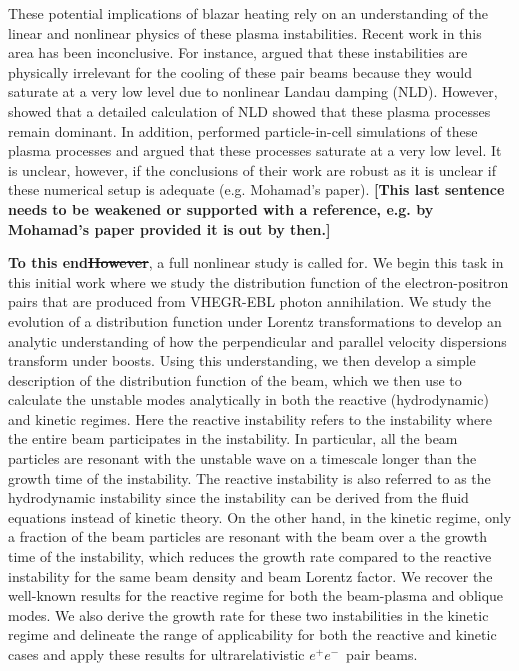 \documentclass[usenatbib,iop,apj,numberedappendix]{aeb_emulateapj_2015}
\newcommand\cp[1]{{\color{blue} \bf #1}} %
\newcommand{\epm}{\ensuremath{e^+e^-}}
\begin{document}
These potential implications of blazar heating rely on an understanding of the linear and nonlinear physics of these plasma instabilities.  Recent work in this area has been inconclusive.  For instance, \citet{Miniati+12} argued that these instabilities are physically irrelevant for the cooling of these pair beams because they would saturate at a very low level due to nonlinear Landau damping (NLD).  However, \citet{Chang+14} showed that a detailed calculation of NLD showed that these plasma processes remain dominant.  In addition, \citet{Sironi+14} performed particle-in-cell simulations of these plasma processes and argued that these processes saturate at a very low level.  It is unclear, however, if the conclusions of their work are robust as it is unclear if these numerical setup is adequate (e.g. Mohamad's paper).  \cp{[This last sentence needs to be weakened or supported with a reference, e.g. by Mohamad's paper provided it is out by then.]}

\cp{To this end\sout{However}}, a full nonlinear study is called for.  We begin this task in this initial work where we study the distribution function of the electron-positron pairs that are produced from VHEGR-EBL photon annihilation.  We study the evolution of a distribution function under Lorentz transformations to develop an analytic understanding of how the perpendicular and parallel velocity dispersions transform under boosts.  Using this understanding, we then develop a simple description of the distribution function of the beam, which we then use to calculate the unstable modes analytically in both the reactive (hydrodynamic) and kinetic regimes. Here the reactive instability refers to the instability where the entire beam participates in the instability.  In particular, all the beam particles are resonant with the unstable wave on a timescale longer than the growth time of the instability.  The reactive instability is also referred to as the hydrodynamic instability since the instability can be derived from the fluid equations instead of kinetic theory.  On the other hand, in the kinetic regime, only a fraction of the beam particles are resonant with the beam over a the growth time of the instability, which reduces the growth rate compared to the reactive instability for the same beam density and beam Lorentz factor.  We recover the well-known results for the reactive regime for both the beam-plasma and oblique modes.  We also derive the growth rate for these two instabilities in the kinetic regime and delineate the range of applicability for both the reactive and kinetic cases and apply these results for ultrarelativistic \epm\ pair beams. 
\end{document}
